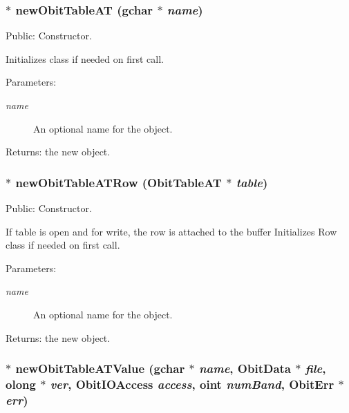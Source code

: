 \subsubsection{$\ast$ new\-Obit\-Table\-AT (gchar $\ast$ {\em name})}\label{ObitTableAT_8c_a16}


Public: Constructor. 

Initializes class if needed on first call. \begin{Desc}
\item[Parameters:]
\begin{description}
\item[{\em name}]An optional name for the object. \end{description}
\end{Desc}
\begin{Desc}
\item[Returns:]the new object. \end{Desc}
\subsubsection{$\ast$ new\-Obit\-Table\-ATRow ({\bf Obit\-Table\-AT} $\ast$ {\em table})}\label{ObitTableAT_8c_a14}


Public: Constructor. 

If table is open and for write, the row is attached to the buffer Initializes Row class if needed on first call. \begin{Desc}
\item[Parameters:]
\begin{description}
\item[{\em name}]An optional name for the object. \end{description}
\end{Desc}
\begin{Desc}
\item[Returns:]the new object. \end{Desc}
\subsubsection{$\ast$ new\-Obit\-Table\-ATValue (gchar $\ast$ {\em name}, {\bf Obit\-Data} $\ast$ {\em file}, {\bf olong} $\ast$ {\em ver}, Obit\-IOAccess {\em access}, {\bf oint} {\em num\-Band}, {\bf Obit\-Err} $\ast$ {\em err})}\label{ObitTableAT_8c_a18}


